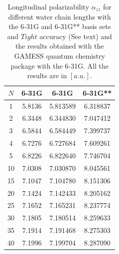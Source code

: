 \documentclass[twocolumn,showpacs,preprintnumbers,amsmath,amssymb]{revtex4}
\begin{document}
\begin{table}
  \centering
  \caption{\protect
    Longitudinal polarizability $\alpha_{zz}$
    for different water chain lengths with the 6-31G and 6-31G** basis sets
    and $Tight$ accuracy (See text) and the results obtained with
    the GAMESS quantum chemistry package \cite{gamess} with the 6-31G. 
    All the results are in $[a.u.]$.
  }\label{tab:Polari_1D_Values}
  \begin{ruledtabular}
    \begin{tabular}{cccc}
      $N$ &\multicolumn{1}{c}{6-31G\footnotemark[1]}
      &\multicolumn{1}{c}{6-31G\footnotemark[2]}
      &\multicolumn{1}{c}{6-31G**\footnotemark[2]}\\
      \hline
      1 & 5.8136 & 5.813589 & 6.318837     \\
      2 & 6.3448 & 6.344830 & 7.047412     \\
      3 & 6.5844 & 6.584449 & 7.399737     \\
      4 & 6.7276 & 6.727684 & 7.609261     \\
      5 & 6.8226 & 6.822640 & 7.746704     \\
     10 & 7.0308 & 7.030870 & 8.045561     \\
     15 & 7.1047 & 7.104780 & 8.151306     \\
     20 & 7.1424 & 7.142433 & 8.205162     \\
     25 & 7.1652 & 7.165231 & 8.237774     \\
     30 & 7.1805 & 7.180514 & 8.259633     \\
     35 & 7.1914 & 7.191468 & 8.275303     \\
     40 & 7.1996 & 7.199704 & 8.287090     \\
    \end{tabular}
  \end{ruledtabular}
\end{table}

\end{document}
